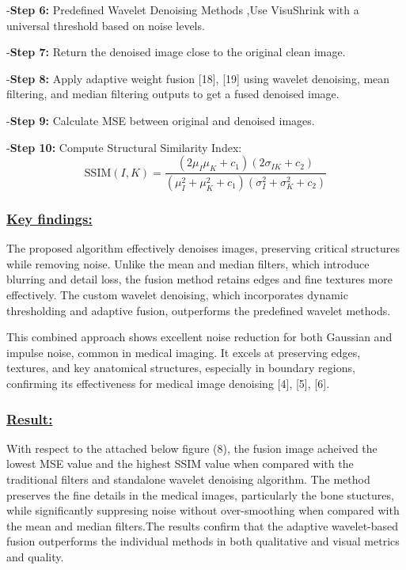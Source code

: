 \documentclass[
  11pt,
]{article}
\begin{document}
-\textbf{Step 6:} Predefined Wavelet Denoising Methods ,Use VisuShrink
with a universal threshold based on noise levels.

-\textbf{Step 7:} Return the denoised image close to the original clean
image.

-\textbf{Step 8:} Apply adaptive weight fusion {[}18{]}, {[}19{]} using
wavelet denoising, mean filtering, and median filtering outputs to get a
fused denoised image.

-\textbf{Step 9:} Calculate MSE between original and denoised images.

-\textbf{Step 10:} Compute Structural Similarity Index:\\
\[
\text{SSIM}(I, K) = \frac{(2\mu_I \mu_K + c_1)(2\sigma_{IK} + c_2)}{(\mu_I^2 + \mu_K^2 + c_1)(\sigma_I^2 + \sigma_K^2 + c_2)}
\]

\subsubsection*{\underline{Key findings:}}

The proposed algorithm effectively denoises images, preserving critical
structures while removing noise. Unlike the mean and median filters,
which introduce blurring and detail loss, the fusion method retains
edges and fine textures more effectively. The custom wavelet denoising,
which incorporates dynamic thresholding and adaptive fusion, outperforms
the predefined wavelet methods.

This combined approach shows excellent noise reduction for both Gaussian
and impulse noise, common in medical imaging. It excels at preserving
edges, textures, and key anatomical structures, especially in boundary
regions, confirming its effectiveness for medical image denoising
{[}4{]}, {[}5{]}, {[}6{]}.

\subsubsection*{\underline{Result:}}

With respect to the attached below figure (8), the fusion image acheived
the lowest MSE value and the highest SSIM value when compared with the
traditional filters and standalone wavelet denoising algorithm. The
method preserves the fine details in the medical images, particularly
the bone stuctures, while significantly suppresing noise without
over-smoothing when compared with the mean and median filters.The
results confirm that the adaptive wavelet-based fusion outperforms the
individual methods in both qualitative and visual metrics and quality.
\end{document}
